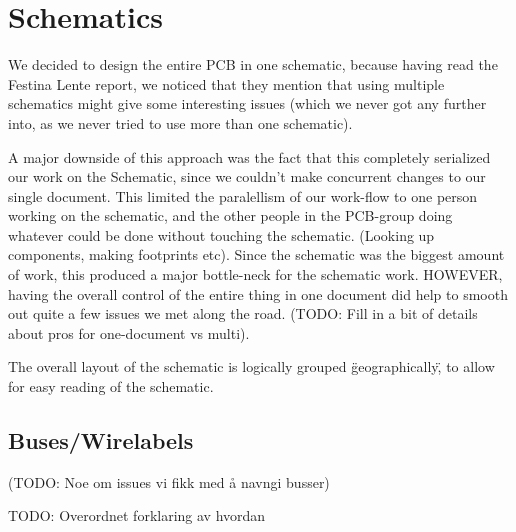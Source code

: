 \section {Schematics}

We decided to design the entire PCB in one schematic, because having read
the Festina Lente report, we noticed that they mention that using multiple schematics
might give some interesting issues (which we never got any further into,
as we never tried to use more than one schematic).

A major downside of this approach was the fact that this completely serialized our
work on the Schematic, since we couldn't make concurrent changes to our single document.
This limited the paralellism of our work-flow to one person working on the schematic,
and the other people in the PCB-group doing whatever could be done without touching the schematic.
(Looking up components, making footprints etc). Since the schematic was the biggest amount
of work, this produced a major bottle-neck for the schematic work. HOWEVER, having the overall
control of the entire thing in one document did help to smooth out quite a few issues we met
along the road. (TODO: Fill in a bit of details about pros for one-document vs multi).

The overall layout of the schematic is logically grouped \"geographically\", to
allow for easy reading of the schematic.

\subsection {Buses/Wirelabels}
(TODO: Noe om issues vi fikk med å navngi busser)

TODO: Overordnet forklaring av hvordan
